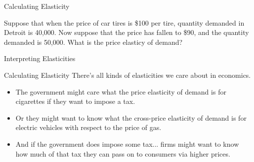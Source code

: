 \documentclass[12pt,t]{beamer}
\begin{document}
\begin{frame}{Calculating Elasticity}

\bigskip
Suppose that when the price of car tires is \$100 per tire, quantity demanded in Detroit is 40,000. Now suppose that the price has fallen to \$90, and the quantity demanded is 50,000. What is the price elasticy of demand?


\end{frame}

\begin{frame}{Interpreting Elasticities}
  \bigskip

\end{frame}

\begin{frame}{Calculating Elasticity}
  There's all kinds of elasticities we care about in economics. 

  \begin{itemize}
    \item The government might care what the price elasticity of demand is for cigarettes if they want to impose a tax.

    \item Or they might want to know what the cross-price elasticity of demand is for electric vehicles with respect to the price of gas.

    \item And if the government does impose some tax... firms might want to know how much of that tax they can pass on to consumers via higher prices.
  \end{itemize}
\end{frame}
\end{document}
